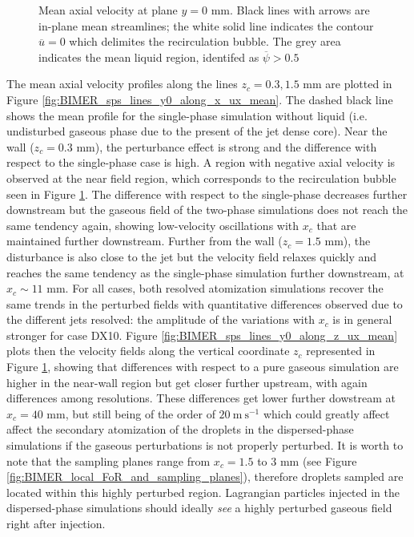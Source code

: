\vspace*{-0.5in}


\begin{figure}[ht]
\centering
\caption[Mean axial velocity at plane $y = 0$ mm]{Mean axial velocity at plane $y = 0$ mm. Black lines with arrows are in-plane mean streamlines; the white solid line indicates the contour $\overline{u} = 0$ which delimites the recirculation bubble. The grey area indicates the mean liquid region, identifed as $\overline{\psi} > 0.5$}
\label{fig:BIMER_turbulent_structures_plane_y0}
\end{figure}


The mean axial velocity profiles along the lines $z_c = 0.3, 1.5$ mm are plotted in Figure \ref{fig:BIMER_sps_lines_y0_along_x_ux_mean}. The dashed black line shows the mean profile for the single-phase simulation without liquid (i.e. undisturbed gaseous phase due to the present of the jet dense core). Near the wall ($z_c = 0.3$ mm), the perturbance effect is strong and the difference with respect to the single-phase case is high. A region with negative axial velocity is observed at the near field region, which corresponds to the recirculation bubble seen in Figure \ref{fig:BIMER_turbulent_structures_plane_y0}. The difference with respect to the single-phase decreases further downstream but the gaseous field of the two-phase simulations does not reach the same tendency again, showing low-velocity oscillations with $x_c$ that are maintained further downstream. Further from the wall ($z_c = 1.5$ mm), the disturbance is also close to the jet but the velocity field relaxes quickly and reaches the same tendency as the single-phase simulation further downstream, at $x_c \sim 11$ mm. For all cases, both resolved atomization simulations recover the same trends in the perturbed fields with quantitative differences observed due to the different jets resolved: the amplitude of the variations with $x_c$ is in general stronger for case DX10. Figure \ref{fig:BIMER_sps_lines_y0_along_z_ux_mean} plots then the velocity fields along the vertical coordinate $z_c$ represented in Figure \ref{fig:BIMER_turbulent_structures_plane_y0}, showing that differences with respect to a pure gaseous simulation are higher in the near-wall region but get closer further upstream, with again differences among resolutions. These differences get lower further dowstream at $x_c = 40$ mm, but still being of the order of $20~\mathrm{m~s}^{-1}$ which could greatly affect affect the secondary atomization of the droplets in the dispersed-phase simulations if the gaseous perturbations is not properly perturbed. It is worth to note that the sampling planes range from $x_c = 1.5$ to $3$ mm (see Figure \ref{fig:BIMER_local_FoR_and_sampling_planes}), therefore droplets sampled are located within this highly perturbed region. Lagrangian particles injected in the dispersed-phase simulations should ideally \textsl{see} a highly perturbed gaseous field right after injection.%
